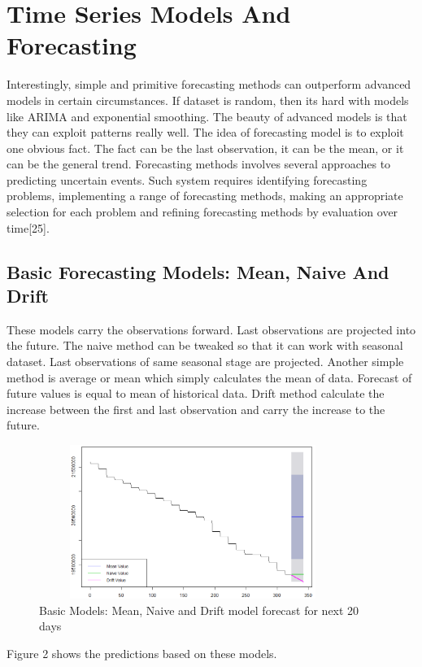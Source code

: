 \documentclass[runningheads]{llncs}
\begin{document}
\section{Time Series Models And Forecasting}
Interestingly, simple and primitive forecasting methods can outperform advanced models in certain circumstances. If dataset is random, then its hard with models like ARIMA and exponential smoothing. The beauty of advanced models is that they can exploit patterns really well. The idea of forecasting model is to exploit one obvious fact. The fact can be the last observation, it can be the mean, or it can be the general trend.
\linebreak
Forecasting methods involves several approaches to predicting uncertain events. Such system requires identifying forecasting problems, implementing a range of forecasting methods, making an appropriate selection for each problem and refining forecasting methods by evaluation over time[25].

\subsection{Basic Forecasting Models: Mean, Naive And Drift}
These models carry the observations forward. Last observations are projected into the future. The naive method can be tweaked so that it can work with seasonal dataset. Last observations of same seasonal stage are projected. Another simple method is average or mean which simply calculates the mean of data. Forecast of future values is equal to mean of historical data. Drift method calculate the increase between the first and last observation and carry the increase to the future.
\begin{figure}
\centering
\includegraphics[scale=1,width=10cm,height=5cm]{BasicModelsNew.png}
\caption{Basic Models: Mean, Naive and Drift model forecast for next 20 days}
\end{figure}
Figure 2 shows the predictions based on these models.
\end{document}
